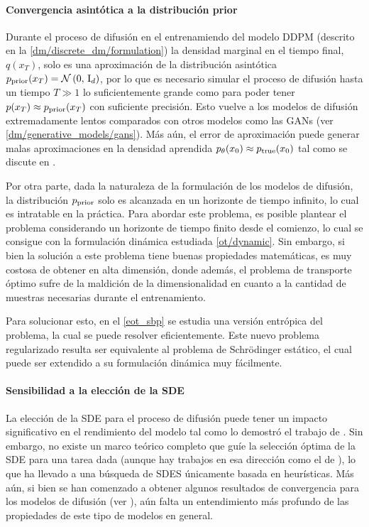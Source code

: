 \paragraph{Convergencia asintótica a la distribución prior}

Durante el proceso de difusión en el entrenamiendo del modelo DDPM (descrito en la \autoref{dm/discrete_dm/formulation}) la densidad marginal en el tiempo final, $q(x_T)$, solo es una aproximación de la distribución asintótica $p_{\operatorname{prior}}(x_T)=\mathcal{N}\left(0,\,\operatorname{I}_{d}\right)$, por lo que es necesario simular el proceso de difusión hasta un tiempo $T\gg1$ lo suficientemente grande como para poder tener $p(x_T)\approx p_{\operatorname{prior}}(x_T)$ con suficiente precisión. Esto vuelve a los modelos de difusión extremadamente lentos comparados con otros modelos como las GANs (ver \autoref{dm/generative_models/gans}). Más aún, el error de aproximación puede generar malas aproximaciones en la densidad aprendida $p_\theta(x_0)\approx p_{\operatorname{true}}(x_0)$ tal como se discute en \cite{debortoli2023diffusion}.

Por otra parte, dada la naturaleza de la formulación de los modelos de difusión, la distribución $p_{\operatorname{prior}}$ solo es alcanzada en un horizonte de tiempo infinito, lo cual es intratable en la práctica. Para abordar este problema, es posible plantear el problema considerando un horizonte de tiempo finito desde el comienzo, lo cual se consigue con la formulación dinámica estudiada \autoref{ot/dynamic}. Sin embargo, si bien la solución a este problema tiene buenas propiedades matemáticas, es muy costosa de obtener en alta dimensión, donde además, el problema de transporte óptimo sufre de la maldición de la dimensionalidad en cuanto a la cantidad de muestras necesarias durante el entrenamiento.

Para solucionar esto, en el \autoref{eot_sbp} se estudia una versión entrópica del problema, la cual se puede resolver eficientemente. Este nuevo problema regularizado resulta ser equivalente al problema de Schrödinger estático, el cual puede ser extendido a su formulación dinámica muy fácilmente.

\paragraph{Sensibilidad a la elección de la SDE}

La elección de la SDE para el proceso de difusión puede tener un impacto significativo en el rendimiento del modelo tal como lo demostró el trabajo de \cite{song2021scorebased}. Sin embargo, no existe un marco teórico completo que guíe la selección óptima de la SDE para una tarea dada (aunque hay trabajos en esa dirección como el de \cite{karras2022elucidatingdesignspacediffusionbased}), lo que ha llevado a una búsqueda de SDES únicamente basada en heurísticas. Más aún, si bien se han comenzado a obtener algunos resultados de convergencia para los modelos de difusión (ver \cite{debortoli2023convergencedenoisingdiffusionmodels}), aún falta un entendimiento más profundo de las propiedades de este tipo de modelos en general.

